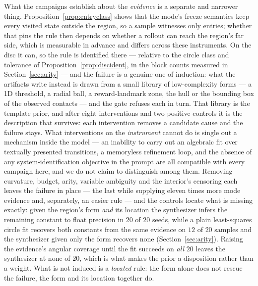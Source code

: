 \documentclass[11pt]{article}
\theoremstyle{definition}
\theoremstyle{remark}
\begin{document}
What the campaigns establish about the \emph{evidence} is a separate and narrower thing. Proposition~\ref{prop:entryclass} shows that the mode's freeze semantics keep every visited state outside the region, so a sample witnesses only entries; whether that pins the rule then depends on whether a rollout can reach the region's far side, which is measurable in advance and differs across these instruments. On the disc it can, so the rule is identified there --- relative to the circle class and tolerance of Proposition~\ref{prop:discident}, in the block counts measured in Section~\ref{sec:arity} --- and the failure is a genuine one of induction: what the artifacts write instead is drawn from a small library of low-complexity forms --- a 1D threshold, a radial ball, a reward-landmark zone, the hull or the bounding box of the observed contacts --- and the gate refuses each in turn. That library is the template prior, and after eight interventions and two positive controls it is the description that survives: each intervention removes a candidate cause and the failure stays. What interventions on the \emph{instrument} cannot do is single out a mechanism inside the model --- an inability to carry out an algebraic fit over textually presented transitions, a memoryless refinement loop, and the absence of any system-identification objective in the prompt are all compatible with every campaign here, and we do not claim to distinguish among them. Removing curvature, budget, arity, variable ambiguity and the interior's censoring each leaves the failure in place --- the last while supplying eleven times more mode evidence and, separately, an easier rule --- and the controls locate what is missing exactly: given the region's form \emph{and} its location the synthesizer infers the remaining constant to float precision in $20$ of $20$ seeds, while a plain least-squares circle fit recovers both constants from the same evidence on $12$ of $20$ samples and the synthesizer given only the form recovers none (Section~\ref{sec:arity}). Raising the evidence's angular coverage until the fit succeeds on \emph{all} $20$ leaves the synthesizer at none of $20$, which is what makes the prior a disposition rather than a weight. What is not induced is a \emph{located} rule: the form alone does not rescue the failure, the form and its location together do.
\end{document}
